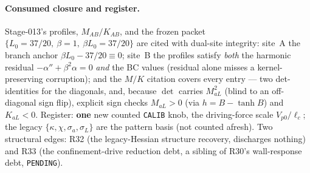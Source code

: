 \paragraph{Consumed closure and register.}
Stage-013's profiles, \(M_{AB}/K_{AB}\), and the frozen packet
\(\{L_0=37/20,\ \beta=1,\ \beta L_0=37/20\}\) are cited with dual-site integrity:
site~A the branch anchor \(\beta L_0-37/20\equiv0\); site~B the profiles satisfy
\emph{both} the harmonic residual \(-\alpha''+\beta^2\alpha=0\) \emph{and} the BC
values (residual alone misses a kernel-preserving corruption); and the \(M/K\)
citation covers every entry --- two det-identities for the diagonals, and, because
\(\det\) carries \(M_{aL}^2\) (blind to an off-diagonal sign flip), explicit sign
checks \(M_{aL}>0\) (via \(h=B-\tanh B\)) and \(K_{aL}<0\). Register: \textbf{one} new
counted \texttt{CALIB} knob, the driving-force scale \(V_{p0}/\ell_c\); the legacy
\(\{\kappa,\chi,\sigma_a,\sigma_L\}\) are the pattern basis (not counted afresh).
Two structural edges: R32 (the legacy-Hessian structure recovery, discharges
nothing) and R33 (the confinement-drive reduction debt, a sibling of R30's
wall-response debt, \texttt{PENDING}).

